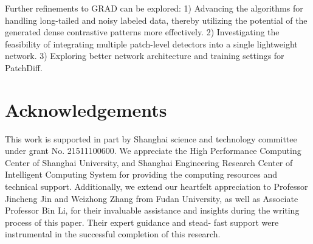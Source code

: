 \documentclass[letterpaper]{article} %
\begin{document}
Further refinements to GRAD can be explored: 1) Advancing the algorithms for handling long-tailed and noisy labeled data, thereby utilizing the potential of the generated dense contrastive patterns more effectively. 2) Investigating the feasibility of integrating multiple patch-level detectors into a single lightweight network. 3) Exploring better network architecture and training settings for PatchDiff.

\section{Acknowledgements}

This work is supported in part by Shanghai science and technology committee under grant No. 21511100600.  We appreciate the High Performance Computing Center of Shanghai University, and Shanghai Engineering Research Center of Intelligent Computing System for providing the computing resources and technical support. Additionally, we extend our heartfelt appreciation to Professor Jincheng Jin and Weizhong Zhang from Fudan University, as well as Associate Professor Bin Li, for their invaluable assistance and insights during the writing process of this paper. Their expert guidance and stead- fast support were instrumental in the successful completion of this research.
\end{document}
